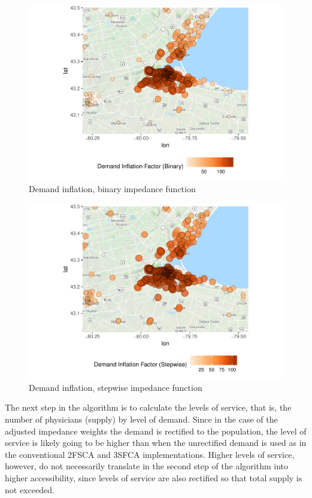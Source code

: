 \documentclass[10pt,letterpaper]{article}
\begin{document}
\begin{figure}
\centering
\includegraphics{Supply_and_Demand_Inflation_in_FCA_Methods_v2.0_files/figure-latex/fig5-map-demand-inflation-binary-1.pdf}
\caption{\label{fig:fig5-map-demand-inflation-binary}Demand inflation,
binary impedance function}
\end{figure}

\begin{figure}
\centering
\includegraphics{Supply_and_Demand_Inflation_in_FCA_Methods_v2.0_files/figure-latex/fig6-map-demand-inflation-stepwise-1.pdf}
\caption{\label{fig:fig6-map-demand-inflation-stepwise}Demand inflation,
stepwise impedance function}
\end{figure}

The next step in the algorithm is to calculate the levels of service,
that is, the number of physicians (supply) by level of demand. Since in
the case of the adjusted impedance weights the demand is rectified to
the population, the level of service is likely going to be higher than
when the unrectified demand is used as in the conventional 2FSCA and
3SFCA implementations. Higher levels of service, however, do not
necessarily translate in the second step of the algorithm into higher
accessibility, since levels of service are also rectified so that total
supply is not exceeded.
\end{document}
